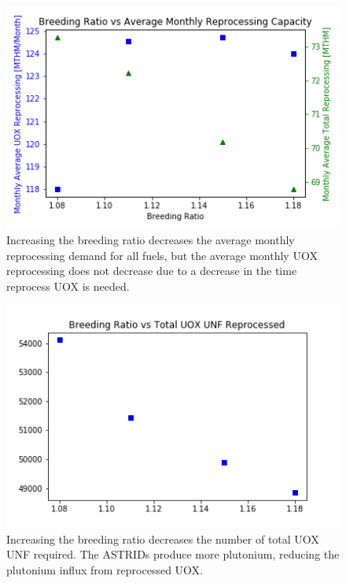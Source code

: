 \begin{figure}[htbp!]
    \begin{center}
        \includegraphics[scale=0.6]{./images/sensitivity/br.png}
    \end{center}
    \caption{Increasing the breeding ratio decreases the average monthly reprocessing demand for all fuels,
             but the average monthly \gls{UOX} reprocessing does not decrease due to a decrease in the time reprocess \gls{UOX} is needed. }
    \label{fig:br_rep}
\end{figure}


\begin{figure}[htbp!]
    \begin{center}
        \includegraphics[scale=0.6]{./images/sensitivity/br_uox.png}
    \end{center}
    \caption{Increasing the breeding ratio decreases the number of total \gls{UOX} \gls{UNF}
             required. The \glspl{ASTRID} produce more plutonium, reducing the plutonium influx
             from reprocessed \gls{UOX}.}
    \label{fig:eu_tail}
\end{figure}


